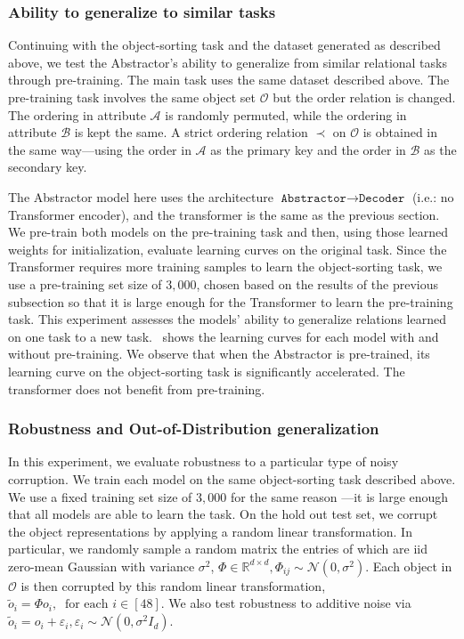 \subsubsection{Ability to generalize to similar tasks}

Continuing with the object-sorting task and the dataset generated as described above, we test the Abstractor's ability to generalize from similar relational tasks through pre-training. The main task uses the same dataset described above. The pre-training task involves the same object set $\mathcal{O}$ but the order relation is changed. The ordering in attribute $\mathcal{A}$ is randomly permuted, while the ordering in attribute $\mathcal{B}$ is kept the same. A strict ordering relation $\prec$ on $\mathcal{O}$ is obtained in the same way---using the order in $\mathcal{A}$ as the primary key and the order in $\mathcal{B}$ as the secondary key.

The Abstractor model here uses the architecture $\texttt{Abstractor} \to \texttt{Decoder}$ (i.e.: no Transformer
encoder), and the transformer is the same as the previous section. We pre-train both models on the pre-training task
and then, using those learned weights for initialization, evaluate learning curves on the original task. Since the
Transformer requires more training samples to learn the object-sorting task, we use a pre-training set size of $3,000$, chosen based on the results of the previous subsection so that it is large enough for the Transformer to learn the pre-training task. This experiment assesses the models' ability to generalize relations learned on one task to a new task.~ shows the learning curves for each model with and without pre-training. We observe that when the Abstractor is pre-trained, its learning curve on the object-sorting task is significantly accelerated. The transformer does not benefit from pre-training.

\subsubsection{Robustness and Out-of-Distribution generalization}
In this experiment, we evaluate robustness to a particular type of noisy corruption. We train each model on the same
object-sorting task described above. We use a fixed training set size of $3,000$ for the same reason
---it is large enough that all models are able to learn the task. On the hold out test set, we corrupt the object
representations by applying a random linear transformation. In particular, we randomly sample a random matrix the
entries of which are iid zero-mean Gaussian with variance $\sigma^2$, $\Phi \in \mathbb{R}^{d \times d}, \Phi_{ij} \sim \mathcal{N}(0, \sigma^2)$. Each object in $\mathcal{O}$ is then corrupted by this random linear transformation,
$\tilde{o}_i = \Phi o_i, \ \text{ for each } i \in [48]$. We also test robustness to additive noise via $\tilde{o}_i = o_i + \varepsilon_i, \varepsilon_i \sim \mathcal{N}(0, \sigma^2 I_d)$.


